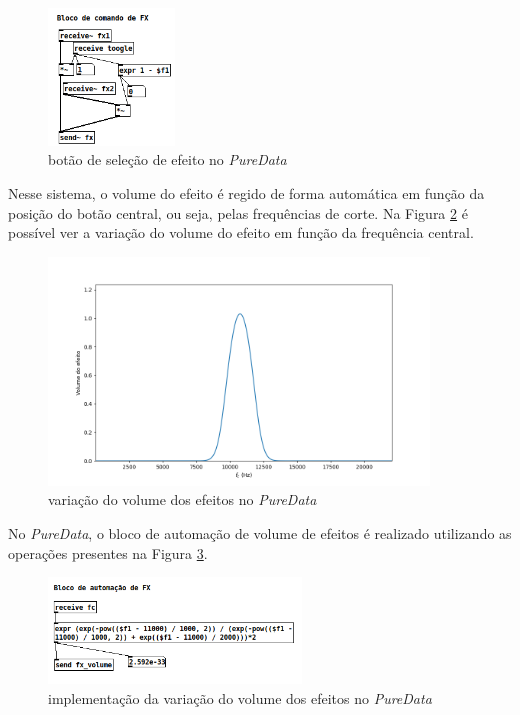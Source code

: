 \begin{figure}[h]
    \centering
    \includegraphics[width=0.3\textwidth]{figuras/fig48.png}
    \caption{botão de seleção de efeito no \textit{PureData}}
    \label{fig48}
\end{figure}

Nesse sistema, o volume do efeito é regido de forma automática em função da posição do botão central, ou seja, pelas frequências de corte. Na Figura \ref{fig49} é possível ver a variação do volume do efeito em função da frequência central.

\begin{figure}[h]
    \centering
    \includegraphics[width=0.9\textwidth]{figuras/fig49.png}
    \caption{variação do volume dos efeitos no \textit{PureData}}
    \label{fig49}
\end{figure}

No \textit{PureData}, o bloco de automação de volume de efeitos é realizado utilizando as operações presentes na Figura \ref{fig50}.

\begin{figure}[h]
    \centering
    \includegraphics[width=0.6\textwidth]{figuras/fig50.png}
    \caption{implementação da variação do volume dos efeitos no \textit{PureData}}
    \label{fig50}
\end{figure}

